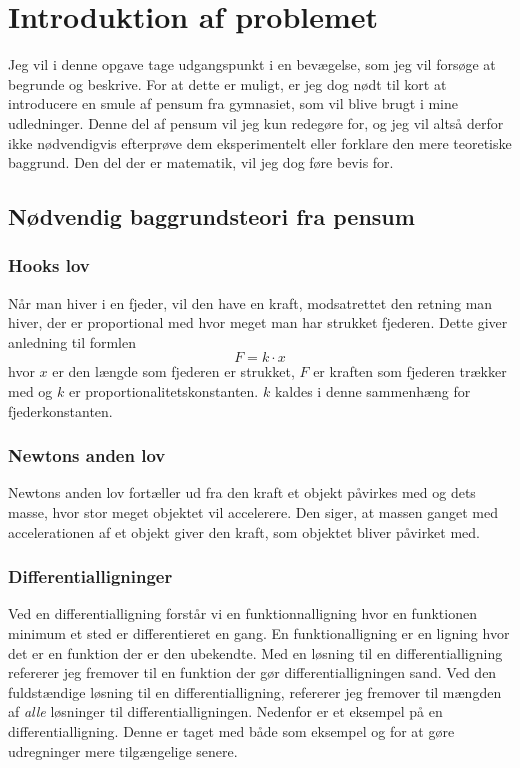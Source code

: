 \chapter{Introduktion af problemet}
Jeg vil i denne opgave tage udgangspunkt i en bevægelse, som jeg vil forsøge at begrunde og beskrive. 
For at dette er muligt, er jeg dog nødt til kort at introducere en smule af pensum fra gymnasiet, som vil blive brugt i mine udledninger. 
Denne del af pensum vil jeg kun redegøre for, og jeg vil altså derfor ikke nødvendigvis efterprøve dem eksperimentelt eller forklare den mere teoretiske baggrund. 
Den del der er matematik, vil jeg dog føre bevis for.

\section{Nødvendig baggrundsteori fra pensum}
\subsection{Hooks lov}\label{teori:Hooks lov}
Når man hiver i en fjeder, vil den have en kraft, modsatrettet den retning man hiver, der er proportional med hvor meget man har strukket fjederen. 
Dette giver anledning til formlen 
$$F =k\cdot x$$
hvor $x$ er den længde som fjederen er strukket, $F$ er kraften som fjederen trækker med og $k$ er proportionalitetskonstanten. 
$k$ kaldes i denne sammenhæng for fjederkonstanten.

\subsection{Newtons anden lov}\label{teori:Newtons anden lov}
Newtons anden lov fortæller ud fra den kraft et objekt påvirkes med og dets masse, hvor stor meget objektet vil accelerere. 
Den siger, at massen ganget med accelerationen af et objekt giver den kraft, som objektet bliver påvirket med.

\subsection{Differentialligninger}
\newcommand{\LosEks}{$ \{ c\cdot e^{kx}|c\in \mR \} $}%
Ved en differentialligning forstår vi en funktionnalligning hvor en funktionen minimum et sted er differentieret en gang.
En funktionalligning er en ligning hvor det er en funktion der er den ubekendte. 
Med en løsning til en differentialligning refererer jeg fremover til en funktion der gør differentialligningen sand. 
Ved den fuldstændige løsning til en differentialligning, refererer jeg fremover til mængden af \emph{alle} løsninger til differentialligningen. 
Nedenfor er et eksempel på en differentialligning. 
Denne er taget med både som eksempel og for at gøre udregninger mere tilgængelige senere.

